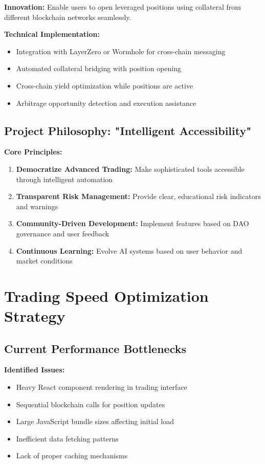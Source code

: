 \documentclass{article}
\begin{document}
\textbf{Innovation:} Enable users to open leveraged positions using collateral from different blockchain networks seamlessly.

\textbf{Technical Implementation:}
\begin{itemize}[leftmargin=*]
    \item Integration with LayerZero or Wormhole for cross-chain messaging
    \item Automated collateral bridging with position opening
    \item Cross-chain yield optimization while positions are active
    \item Arbitrage opportunity detection and execution assistance
\end{itemize}

\subsection{Project Philosophy: "Intelligent Accessibility"}

\textbf{Core Principles:}
\begin{enumerate}[leftmargin=*]
    \item \textbf{Democratize Advanced Trading:} Make sophisticated tools accessible through intelligent automation
    \item \textbf{Transparent Risk Management:} Provide clear, educational risk indicators and warnings
    \item \textbf{Community-Driven Development:} Implement features based on DAO governance and user feedback
    \item \textbf{Continuous Learning:} Evolve AI systems based on user behavior and market conditions
\end{enumerate}

\section{Trading Speed Optimization Strategy}

\subsection{Current Performance Bottlenecks}

\textbf{Identified Issues:}
\begin{itemize}[leftmargin=*]
    \item Heavy React component rendering in trading interface
    \item Sequential blockchain calls for position updates
    \item Large JavaScript bundle sizes affecting initial load
    \item Inefficient data fetching patterns
    \item Lack of proper caching mechanisms
\end{itemize}
\end{document}
